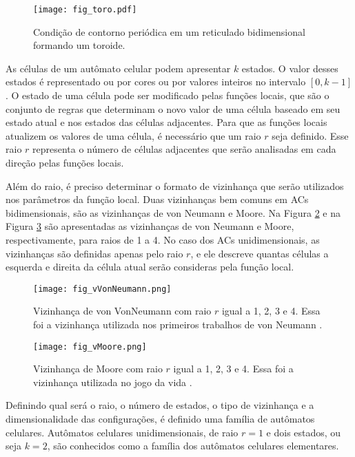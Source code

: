 	\begin{figure}[h!]
	  \centering
	  \texttt{[image: fig\_toro.pdf]}
	  \caption{Condição de contorno periódica em um reticulado bidimensional formando um toroide.}
	  \label{fig:toro}
	\end{figure}

As células de um autômato celular podem apresentar $k$ estados. O valor desses estados é representado ou por cores ou por valores inteiros no intervalo $[0, k-1]$. O estado de uma célula pode ser modificado pelas funções locais, que são o conjunto de regras que determinam o novo valor de uma célula baseado em seu estado atual e nos estados das células adjacentes. Para que as funções locais atualizem os valores de uma célula, é necessário que um raio $r$ seja definido. Esse raio $r$ representa o número de células adjacentes que serão analisadas em cada direção pelas funções locais.

Além do raio, é preciso determinar o formato de vizinhança que serão utilizados nos parâmetros da função local. Duas vizinhanças bem comuns em ACs bidimensionais, são as vizinhanças de von Neumann e Moore. Na Figura \ref{fig:vVonNeumann} e na Figura \ref{fig:vMoore} são apresentadas as vizinhanças de von Neumann e Moore, respectivamente, para raios de 1 a 4. No caso dos ACs unidimensionais, as vizinhanças são definidas apenas pelo raio $r$, e ele descreve quantas células a esquerda e direita da célula atual serão consideras pela função local.
	\begin{figure}[h!]
	  \centering
	  \texttt{[image: fig\_vVonNeumann.png]}
	  \caption{Vizinhança de von VonNeumann com raio $r$ igual a 1, 2, 3 e 4. Essa foi a vizinhança utilizada nos primeiros trabalhos de von Neumann \cite{weisstein2015b}.}
	  \label{fig:vVonNeumann}
	\end{figure}

	\begin{figure}[h!]
	  \centering
	  \texttt{[image: fig\_vMoore.png]}
	  \caption{Vizinhança de Moore com raio $r$ igual a 1, 2, 3 e 4. Essa foi a vizinhança utilizada no jogo da vida \cite{weisstein2015c}.}
	  \label{fig:vMoore}
	\end{figure}

Definindo qual será o raio, o número de estados, o tipo de vizinhança e a dimensionalidade das configurações, é definido uma família de autômatos celulares. Autômatos celulares unidimensionais, de raio $r=1$ e dois estados, ou seja $k=2$, são conhecidos como a família dos autômatos celulares elementares.

